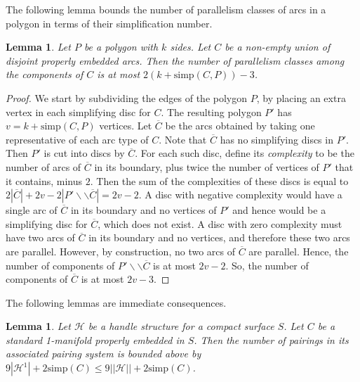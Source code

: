 \documentclass[oneside]{amsart}
\numberwithin{equation}{section}
\theoremstyle{plain}
\newtheorem{lemma}[equation]{Lemma}
\theoremstyle{definition}
\newcommand{\cut}{\backslash\backslash}
\newcommand{\calH}{\mathcal{H}}
\begin{document}
The following lemma bounds the number of parallelism classes of arcs in a polygon in terms of their simplification number.

\begin{lemma}
\label{Lem:ArcTypesInPolygon}
Let $P$ be a polygon with $k$ sides. Let $C$ be a non-empty union of disjoint properly embedded arcs. Then the number of parallelism classes among the components of $C$ is at most
$2(k + \mathrm{simp}(C,P)) - 3$.
\end{lemma}

\begin{proof}
We start by subdividing the edges of the polygon $P$, by placing an extra vertex in each simplifying disc for $C$. The resulting polygon $P'$
has $v = k + \mathrm{simp}(C,P)$ vertices. Let $\overline{C}$ be the arcs obtained by taking one representative of each arc type of $C$.
Note that $\overline{C}$ has no simplifying discs in $P'$.
Then $P'$ is cut into discs by $\overline{C}$. For each such disc, define its \emph{complexity} to be the number of arcs of $\overline{C}$ in its boundary, 
plus twice the number of vertices of $P'$ that it contains, minus $2$. Then the sum of the complexities of these discs is equal to $2 |\overline{C}| + 2 v - 2 |P' \cut \overline{C}| = 2v - 2$. 
A disc with negative complexity would have a single arc of $\overline{C}$ in its boundary and no vertices of $P'$ and hence would be a simplifying disc for $\overline{C}$, which does not exist. 
A disc with zero complexity must have two arcs of $\overline{C}$ in its boundary and no vertices,
and therefore these two arcs are parallel. However, by construction, no two arcs of $\overline{C}$ are parallel. Hence, the number of components of 
$P' \cut \overline{C}$ is at most $2v-2$. So, the number of components of $\overline{C}$ is at most $2v-3$.
\end{proof}

The following lemmas are immediate consequences.

\begin{lemma} 
\label{Lem:NumberOfPairingsCurve}
Let $\calH$ be a handle structure for a compact surface $S$. 
Let $C$ be a standard 1-manifold properly embedded in $S$. Then the number of pairings in its associated pairing system
is bounded above by $9|\calH^1| + 2\mathrm{simp}(C) \leq 9||\calH|| + 2\mathrm{simp}(C)$.
\end{lemma}
\end{document}
